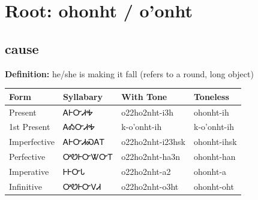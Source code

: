 \documentclass{article}%
\begin{document}
%
\normalsize%
\section*{Root: ohonht / o'onht}%
\subsection*{cause}%
\textbf{Definition: }%
he/she is making it fall (refers to a round‚ long object)%
\\[0.5em]%
\begin{tabular}{|l|l|l|l|}%
\hline%
\textbf{Form}&\textbf{Syllabary}&\textbf{With Tone}&\textbf{Toneless}\\%
\hline%
Present&ᎪᎰᏅᏗᎭ&o22ho2nht{-}i3h&ohonht{-}ih\\%
1st Present&ᎪᎣᏅᏗᎭ&k{-}o'onht{-}ih&k{-}o'onht{-}ih\\%
Imperfective&ᎪᎰᏅᏗᏍᎪᎢ&o22ho2nht{-}i23hsk&ohonht{-}ihsk\\%
Perfective&ᎤᏬᎰᏅᏔᏅᎢ&o22ho2nht{-}ha3n&ohonht{-}han\\%
Imperative&ᎰᎰᏅᏓ&o22ho2nht{-}a2&ohonht{-}a\\%
Infinitive&ᎤᏬᎰᏅᏙᏗ&o22ho2nht{-}o3ht&ohonht{-}oht\\%
\hline%
\end{tabular}%
\\[1em]%
\end{document}
